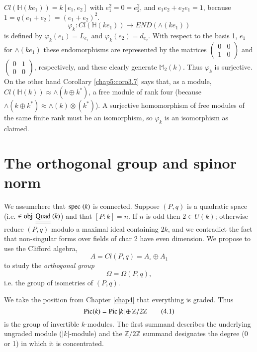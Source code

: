 \begin{proofof}
$Cl (\mathbb{H} (ke_1)) = k[e_1, e_2]$ with $e^2_1 = 0 = e^2_2$, and
$e_1 e_2 + e_2 e_1 = 1$, because $1 = q(e_1 + e_2) = (e_1 + e_2)^2$. 
$$
\varphi_k : Cl (\mathbb{H} (ke_1)) \to END (\wedge (ke_1)) 
$$
is defined by $\varphi_k(e_1) = L_{e_1}$ and $\varphi_k (e_2)=
d_{e_2}$. With respect to the basis 1, $e_1 $ for $\wedge (ke_1)$
these endomorphisms are represented by the matrices
$\left(\begin{smallmatrix} 0 & 0 \\ 1 & 0 \end{smallmatrix}\right)$
and $\left(\begin{smallmatrix} 0 & 1 \\ 0 &
  0 \end{smallmatrix}\right)$, respectively, and these clearly
generate $\mathbb{M}_2 (k)$. Thus $\varphi_k$ is surjective. On the
other hand Corollary \ref{chap5:coro3.7} says that, as a module, $Cl
(\mathbb{H}(k)) 
\approx \wedge (k \oplus k^\ast)$, a free module of rank four (because
$\wedge (k \oplus k^\ast ) \approx \wedge (k) \otimes (k^\ast)$). A
surjective homomorphism of free modules of the same finite rank must
be an isomorphism, so $\varphi_k$ is an isomorphism as claimed. 
\end{proofof}

\section{The orthogonal group and spinor norm}\label{chap5:sec4} %

We assume\pageoriginale here that $\operatorname{spec} \; (k)$ is connected. Suppose
$(P, q)$ is a quadratic space (i.e. $\in \operatorname{obj} \
\underline{\underline{\rm Quad}} \ (k)$) and that $[P:k] = n$. If $n$ is
odd then $2 \in U (k)$; otherwise reduce $(P, q)$ modulo a maximal
ideal containing $2k$, and we contradict the fact that non-singular
forms over fields of char 2 have even dimension. We propose to use the
Clifford algebra,  
$$
A = Cl (P, q) = A_\circ  \oplus A_1
$$
to study the \textit{orthogonal group}
$$
\Omega = \Omega (P, q),
$$
i.e. the group of isometries of $(P, q)$.

We take the position from Chapter \ref{chap4} that everything is
graded. Thus   
\begin{equation*}
\operatorname{Pic} (k) = \operatorname{Pic} |k| \oplus \mathbb{Z} / 2 \mathbb{Z}
\tag{4.1}\label{eq4.1} 
\end{equation*} 
is the group of invertible $k$-modules. The first summand describes
the underlying ungraded module ($|k|$-module) and the $\mathbb{Z} / 2
\mathbb{Z}$ summand designates the degree (0 or 1) in which it is
concentrated. 

